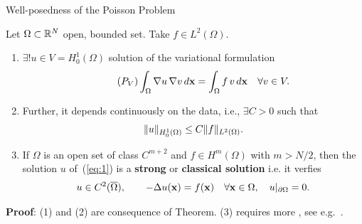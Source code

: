 \begin{frame}{Well-posedness of the Poisson Problem}
  \begin{theorem}
    Let $\Omega \subset \Rset^N$ open, bounded set. Take $f\in L^2(\Omega)$.
    \begin{enumerate}
    \item \alert{$\exists! u \in V=H_0^1(\Omega)$ solution} of the variational formulation
      \begin{equation}
        \tag{\ensuremath{P_V}}
        \int_\Omega \grad u \, \grad v \,d\xx = \int_\Omega f\, v \, d\xx \quad \forall v\in V.
        \label{eq:1}
      \end{equation}
    \item Further, it \alert{depends continuously on the data}, i.e., $\exists C>0$ such that
      $$
      \norm[H_0^1(\Omega)]{u} \le C \norm[L^2(\Omega)]{f}.
      $$
    \item If $\Omega$ is an open set of class $C^{m+2}$ and
      $f\in H^m(\Omega)$ with $m>N/2$, then the solution $u$
      of~(\ref{eq:1}) is a \alert{\textbf{strong} or \textbf{classical solution}} i.e. it verfies
      $$
      u\in C^2(\overline\Omega), \qquad -\Delta u(\xx) = f(\xx) \quad \forall \xx\in\Omega, \quad u|_{\partial\Omega}=0.
      $$
    \end{enumerate}
  \end{theorem}
  \scriptsize \textbf{Proof}: (1) and (2) are consequence of
   Theorem. (3) requires more , see e.g.~\cite{brezis:2017,allaire:2007}.
\end{frame}





